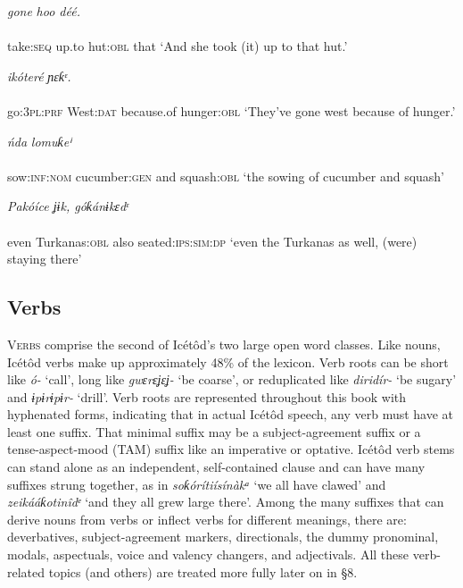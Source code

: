 \ea\label{ex:}
   \textit{gone}\textit{   hoo     déé.} \\
    \\
take:\textsc{seq}   up.to   hut:\textsc{obl}   that
\glt ‘And she took (it) up to that hut.’ 
\z




\ea\label{ex:}
   \textit{ikóteré}\textit{   ɲɛƙᵋ.} \\
    \\
go:\textsc{3pl:prf}   West:\textsc{dat}   because.of   hunger:\textsc{obl}
\glt ‘They’ve gone west because of hunger.’ 
\z




\ea\label{ex:}
       \textit{ńda}\textit{   lomuƙeⁱ} \\
    \\
sow:\textsc{inf:nom}   cucumber:\textsc{gen}   and   squash:\textsc{obl}
\glt ‘the sowing of cucumber and squash’ 
\z




\ea\label{ex:}
\textit{   Pakóíce     ʝɨk,   góƙánɨkɛdᵋ} \\
    \\
even  Turkanas:\textsc{obl}   also   seated:\textsc{ips:sim:dp}
\glt ‘even the Turkanas as well, (were) staying there’ 
\z






\subsection{Verbs}


\textsc{Verbs} comprise the second of Icétôd’s two large open word classes. Like nouns, Icétôd verbs make up approximately 48\% of the lexicon. Verb roots can be short like \textit{ó-} ‘call’, long like \textit{gwɛrɛʝɛʝ-} ‘be coarse’, or reduplicated like \textit{diridír-} ‘be sugary’ and \textit{ɨpɨrɨpɨr-} ‘drill’. Verb roots are represented throughout this book with hyphenated forms, indicating that in actual Icétôd speech, any verb must have at least one suffix. That minimal suffix may be a subject-agreement suffix or a tense-aspect-mood (TAM) suffix like an imperative or optative. Icétôd verb stems can stand alone as an independent, self-contained clause and can have many suffixes strung together, as in \textit{soƙórítiísínàkᵃ} ‘we all have clawed’ and \textit{zeikááƙotinîdᵉ} ‘and they all grew large there’. Among the many suffixes that can derive nouns from verbs or inflect verbs for different meanings, there are: deverbatives, subject-agreement markers, directionals, the dummy pronominal, modals, aspectuals, voice and valency changers, and adjectivals. All these verb-related topics (and others) are treated more fully later on in §8.




